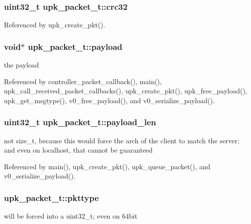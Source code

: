 \subsubsection[{crc32}]{\setlength{\rightskip}{0pt plus 5cm}uint32\_\-t {\bf upk\_\-packet\_\-t::crc32}}\label{structupk__packet__t_a440fa8d8947e7f5c17997d51f12d4cee}


Referenced by upk\_\-create\_\-pkt().

\subsubsection[{payload}]{\setlength{\rightskip}{0pt plus 5cm}void$\ast$ {\bf upk\_\-packet\_\-t::payload}}\label{structupk__packet__t_aeae9f273821e5bb68fd6957cbde86a14}
the payload 

Referenced by controller\_\-packet\_\-callback(), main(), upk\_\-call\_\-received\_\-packet\_\-callbacks(), upk\_\-create\_\-pkt(), upk\_\-free\_\-payload(), upk\_\-get\_\-msgtype(), v0\_\-free\_\-payload(), and v0\_\-serialize\_\-payload().

\subsubsection[{payload\_\-len}]{\setlength{\rightskip}{0pt plus 5cm}uint32\_\-t {\bf upk\_\-packet\_\-t::payload\_\-len}}\label{structupk__packet__t_a4763ca6853e27fe3eb7e2b3ec45deeb5}
not size\_\-t, because this would force the arch of the client to match the server; and even on localhost, that cannot be guaranteed 

Referenced by main(), upk\_\-create\_\-pkt(), upk\_\-queue\_\-packet(), and v0\_\-serialize\_\-payload().

\subsubsection[{pkttype}]{ {\bf upk\_\-packet\_\-t::pkttype}}\label{structupk__packet__t_a90897befc1fe65ebb2c18748a5881d83}
will be forced into a uint32\_\-t; even on 64bit 

